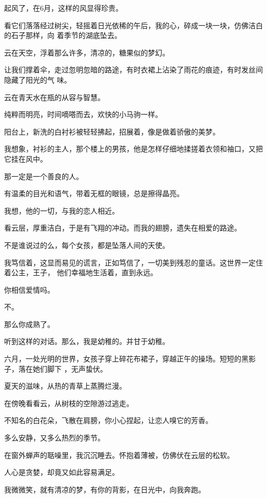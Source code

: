 \documentclass[12pt,a4paper]{article}
\begin{document}
	\endwriting



		起风了，在6月，这样的风显得珍贵。

		看它们落落经过树尖，轻摇着日光依稀的午后，我的心，碎成一块一块，仿佛洁白的石子那样，向
	着季节的湖底坠去。


		云在天空，浮着那么许多，清凉的，糖果似的梦幻。

		让我们撑着伞，走过忽明忽暗的路途，有时衣裙上沾染了雨花的痕迹，有时发丝间隐藏了阳光的气
	味。

		云在青天水在瓶的从容与智慧。

		纯粹而明亮，时间嘀嗒而去，欢快的小马驹一样。

		阳台上，新洗的白衬衫被轻轻拂起，招展着，像是做着骄傲的美梦。

		我想象，衬衫的主人，那个楼上的男孩，他是怎样仔细地揉搓着衣领和袖口，又把它挂在风中。

		那一定是一个善良的人。

		有温柔的目光和语气，带着无框的眼镜，总是擦得晶亮。

		我想，他的一切，与我的恋人相近。


		看云层，厚重洁白，于是有飞翔的冲动。而我的翅膀，遗失在相爱的路途。

		不是谁说过的么，每个女孩，都是坠落人间的天使。

		我笃信着，这显而易见的谎言，正如笃信了，一切美到残忍的童话。这世界一定住着公主，王子，
	他们幸福地生活着，直到永远。


		你相信爱情吗。

		不。

		那么你成熟了。


		听到这样的对话。那么，我是幼稚的。并甘于幼稚。

	\endwriting



		六月，一处光明的世界，女孩子穿上碎花布裙子，穿越正午的操场。短短的黑影子，落在她们脚下
	，无声蛰伏。

		夏天的滋味，从热的青草上蒸腾烂漫。\par
		在傍晚看看云，从树枝的空隙游过逃走。\par
		不知名的白花朵，飞散在肩膀，你小心捏起，让恋人嗅它的芳香。

		多么安静，又多么热烈的季节。

		在窗外蝉声的聒噪里，我沉沉睡去。怀抱着薄被，仿佛伏在云层的松软。\par
		人心是贪婪，却竟又如此容易满足。\par
		我微微笑，就有清凉的梦，有你的背影，在日光中，向我奔跑。
\end{document}
